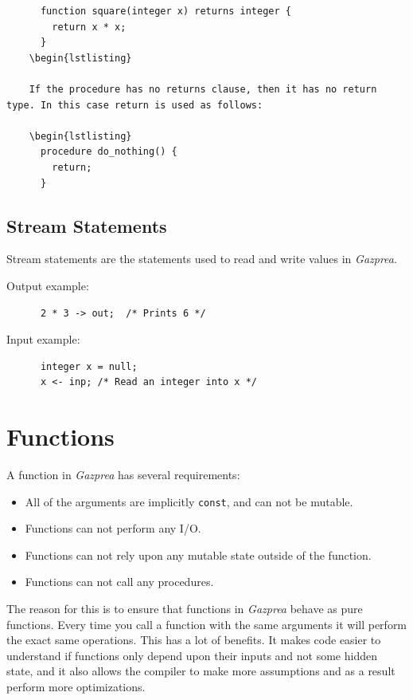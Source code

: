 \documentclass{article}
\begin{document}
    \begin{lstlisting}
      function square(integer x) returns integer {
        return x * x;
      }
    \begin{lstlisting}

    If the procedure has no returns clause, then it has no return type. In this case return is used as follows:

    \begin{lstlisting}
      procedure do_nothing() {
        return;
      }
    \end{lstlisting}


  \subsection{Stream Statements}

    Stream statements are the statements used to read and write values in \textit{Gazprea}.

    Output example:

    \begin{lstlisting}
      2 * 3 -> out;  /* Prints 6 */
    \end{lstlisting}

    Input example:

    \begin{lstlisting}
      integer x = null;
      x <- inp; /* Read an integer into x */
    \end{lstlisting}


\section{Functions}\label{sec:function}

  A function in \textit{Gazprea} has several requirements:

  \begin{itemize}
    \item All of the arguments are implicitly \texttt{const}, and can not be mutable.
    \item Functions can not perform any I/O.
    \item Functions can not rely upon any mutable state outside of the function.
    \item Functions can not call any procedures.
  \end{itemize}

  The reason for this is to ensure that functions in \textit{Gazprea} behave as pure functions. Every time you call a
  function with the same arguments it will perform the exact same operations. This has a lot of benefits. It makes
  code easier to understand if functions only depend upon their inputs and not some hidden state, and it also allows
  the compiler to make more assumptions and as a result perform more optimizations.
\end{document}
